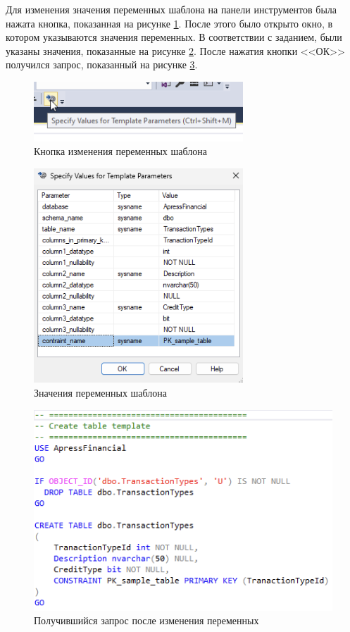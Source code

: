 \documentclass[a4paper, 14pt]{extarticle}
\begin{document}
Для изменения значения переменных шаблона на панели инструментов была нажата
кнопка, показанная на рисунке \ref{fig:task-3-3}. После этого было открыто окно,
в котором указываются значения переменных. В соответствии с заданием, были
указаны значения, показанные на рисунке \ref{fig:task-3-4}. После нажатия кнопки
<<ОК>> получился запрос, показанный на рисунке \ref{fig:task-3-5}.

\begin{figure}[H]
  \centering
  \includegraphics[width=0.7\textwidth]{images/task-3/3.png}
  \caption{Кнопка изменения переменных шаблона}
  \label{fig:task-3-3}
\end{figure}

\begin{figure}[H]
  \centering
  \includegraphics[width=0.7\textwidth]{images/task-3/4.png}
  \caption{Значения переменных шаблона}
  \label{fig:task-3-4}
\end{figure}

\begin{figure}[H]
  \centering
  \includegraphics[width=\textwidth]{images/task-3/5.png}
  \caption{Получившийся запрос после изменения переменных}
  \label{fig:task-3-5}
\end{figure}
\end{document}
